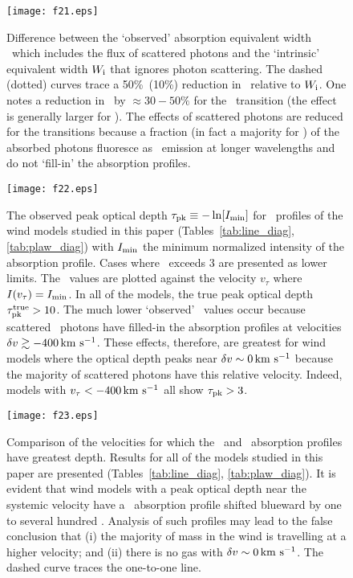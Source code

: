 \documentclass[12pt,preprint]{aastex}
\begin{document}
\begin{figure}
\texttt{[image: f21.eps]}
\caption{
Difference between the `observed' absorption equivalent width \ewabs\
which includes the flux of scattered photons and the `intrinsic'
equivalent width $W_{\rm i}$ that ignores photon scattering.  The
dashed (dotted) curves trace a 50\%\ (10\%) reduction in \ewabs\
relative to $W_{\rm i}$.  One notes a reduction in \ewabs\ by $\approx
30-50\%$ for the \mgiia\ transition (the effect is generally larger
for \mgiib).  The effects of scattered photons are reduced for the
\ion{Fe}{2} transitions because a fraction (in fact a majority for
\feiia) of the absorbed photons fluoresce as \feiis\ emission at
longer wavelengths and do not `fill-in' the absorption profiles.
}
\label{fig:obs_ew}
\end{figure}

\begin{figure}
\texttt{[image: f22.eps]}
\caption{
The observed peak optical depth $\tau_{\rm pk} \equiv -\ln [I_{\rm
  min}]$ for \mgiia\ profiles of the wind models studied in this paper
(Tables~\ref{tab:line_diag}, \ref{tab:plaw_diag}) with $I_{\rm min}$
the minimum normalized intensity of the absorption profile.  Cases
where \tpk\ exceeds 3 are presented as lower limits.  The \tpk\ values
are plotted against the velocity $v_\tau$ where $I(v_\tau) = I_{\rm min}$.  In all
of the models, the true peak optical depth $\tau_{\rm pk}^{\rm true} > 10$.
The much lower `observed' \tpk\ values occur because scattered \mgiia\
photons have filled-in the absorption profiles at velocities $\delta v
\gtrsim -400 \, {\rm km~s^{-1}}$. These effects, therefore, are greatest for wind
models where the optical depth peaks near $\delta v \sim 0 \, {\rm km~s^{-1}}$ because
the majority of scattered photons have this relative velocity.
Indeed, models with $v_\tau < -400 \, {\rm km~s^{-1}}$ all show $\tau_{\rm pk} > 3$.
}
\label{fig:obs_peaktau}
\end{figure}

\begin{figure}
\texttt{[image: f23.eps]}
\caption{
Comparison of the velocities for which the \feiia\ and \mgiia\ absorption
profiles have greatest depth.  Results for all of the models
studied in this paper are presented (Tables~\ref{tab:line_diag},
\ref{tab:plaw_diag}).  
It is evident that wind models with a peak optical depth near the
systemic velocity have a \mgiia\ absorption profile shifted blueward
by one to several hundred \kms.  Analysis of such profiles may lead to
the false conclusion 
that (i) the majority of mass in the wind is travelling at a higher
velocity; and (ii) there is no gas with $\delta v \sim 0 \, {\rm km~s^{-1}}$.
The dashed curve traces the one-to-one line.
}
\label{fig:obs_vtau}
\end{figure}
\end{document}

